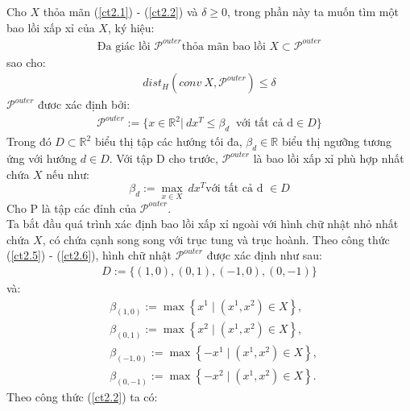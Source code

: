 \documentclass[12pt,a4paper,openany,oneside]{report}
\begin{document}
Cho $X$ thỏa mãn (\ref{ct2.1}) - (\ref{ct2.2}) và $\delta \geq 0$, trong phần này ta muốn tìm một bao lồi xấp xỉ của $X$, ký hiệu:
\begin{align}\label{ct2.4}
	\text{Đa giác lồi }\mathcal{P}^{outer} \text{thỏa mãn bao lồi }X\subset\mathcal{P}^{outer}
\end{align}
sao cho:
\begin{align}\label{ct2.5}
	dist_H\left(conv\ X, \mathcal{P}^{outer}\right) \leq \delta
\end{align}
$\mathcal{P}^{outer}$ đươc xác định bởi:
\begin{align}\label{ct2.6}
	\mathcal{P}^{outer} := \{x\in\mathbb{R}^2 |\ dx^T \leq \beta_d\ \text{ với tất cả d} \in D\}
\end{align}
Trong đó $D \subset \mathbb{R}^2$ biểu thị tập các hướng tối đa, $\beta_d \in \mathbb{R}$ biểu thị ngưỡng tương ứng với hướng $d \in D$. Với tập D cho trước, $\mathcal{P}^{outer}$ là bao lồi xấp xỉ phù hợp nhất chứa $X$ nếu như:
\begin{equation}\label{ct2.7}
	\beta_d:=\max _{x \in X}\ d x^T \text{với tất cả d }\in D
\end{equation}
Cho P là tập các đỉnh của $\mathcal{P}^{outer}$.\\
Ta bắt đầu quá trình xác định bao lồi xấp xỉ ngoài với hình chữ nhật nhỏ nhất chứa $X$, có chứa cạnh song song với trục tung và trục hoành. Theo công thức (\ref{ct2.5}) - (\ref{ct2.6}), hình chữ nhật $\mathcal{P}^{outer}$ được xác định như sau:
\begin{align}\label{ct2.8}
	D:=\{(1, 0), (0, 1), (-1, 0), (0, -1)\}
\end{align}
và:
\begin{equation}\label{ct2.9}
	\begin{aligned}
		& \beta_{(1,0)}:=\max \left\{x^1 \mid\left(x^1, x^2\right) \in X\right\}, \\
		& \beta_{(0,1)}:=\max \left\{x^2 \mid\left(x^1, x^2\right) \in X\right\}, \\
		& \beta_{(-1,0)}:=\max \left\{-x^1 \mid\left(x^1, x^2\right) \in X\right\}, \\
		& \beta_{(0,-1)}:=\max \left\{-x^2 \mid\left(x^1, x^2\right) \in X\right\} .
	\end{aligned}
\end{equation}
Theo công thức (\ref{ct2.2}) ta có:
\end{document}
